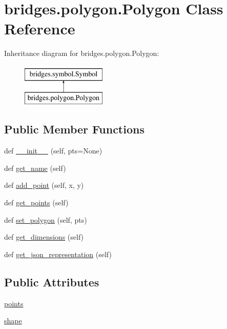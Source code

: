 \hypertarget{classbridges_1_1polygon_1_1_polygon}{}\section{bridges.\+polygon.\+Polygon Class Reference}
\label{classbridges_1_1polygon_1_1_polygon}
Inheritance diagram for bridges.\+polygon.\+Polygon\+:\begin{figure}[H]
\begin{center}
\leavevmode
\includegraphics[height=2.000000cm]{classbridges_1_1polygon_1_1_polygon}
\end{center}
\end{figure}
\subsection*{Public Member Functions}
\begin{DoxyCompactItemize}
\item 
def \mbox{\hyperlink{classbridges_1_1polygon_1_1_polygon_a6e2515889df5d8626a32de2d4b36abc1}{\+\_\+\+\_\+init\+\_\+\+\_\+}} (self, pts=None)
\item 
def \mbox{\hyperlink{classbridges_1_1polygon_1_1_polygon_afa0d94f62a19b24ad3764bc900718346}{get\+\_\+name}} (self)
\item 
def \mbox{\hyperlink{classbridges_1_1polygon_1_1_polygon_acc80ff94c56d5c13dcf5f200cb3d1cb3}{add\+\_\+point}} (self, x, y)
\item 
def \mbox{\hyperlink{classbridges_1_1polygon_1_1_polygon_aba7ab8bb316dbda1006f647139b25771}{get\+\_\+points}} (self)
\item 
def \mbox{\hyperlink{classbridges_1_1polygon_1_1_polygon_a150cdd5b40f595140a6fc59010dbd463}{set\+\_\+polygon}} (self, pts)
\item 
def \mbox{\hyperlink{classbridges_1_1polygon_1_1_polygon_ad5f641b4cf5b41279b017ad6afa1face}{get\+\_\+dimensions}} (self)
\item 
def \mbox{\hyperlink{classbridges_1_1polygon_1_1_polygon_a7ae79de126a330a80da8cc1db4af16b3}{get\+\_\+json\+\_\+representation}} (self)
\end{DoxyCompactItemize}
\subsection*{Public Attributes}
\begin{DoxyCompactItemize}
\item 
\mbox{\hyperlink{classbridges_1_1polygon_1_1_polygon_a6098888be9cbaf0536e85924609559e3}{points}}
\item 
\mbox{\hyperlink{classbridges_1_1polygon_1_1_polygon_a6e441d7a6962358a2d0ee6aec7312635}{shape}}
\end{DoxyCompactItemize}
